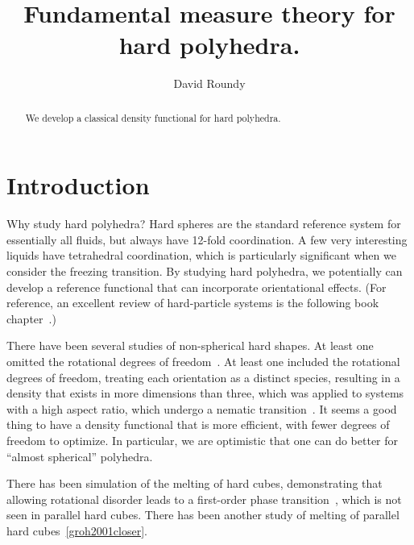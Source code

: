 \documentclass[letterpaper,twocolumn,amsmath,amssymb,pre]{revtex4-1}
\begin{document}
\title{Fundamental measure theory for hard polyhedra.}

\author{David Roundy}
\begin{abstract}
  We develop a classical density functional for hard polyhedra.
\end{abstract}

\maketitle


\section{Introduction}

Why study hard polyhedra? Hard spheres are the standard reference
system for essentially all fluids, but always have 12-fold
coordination.  A few very interesting liquids have tetrahedral
coordination, which is particularly significant when we consider the
freezing transition.  By studying hard polyhedra, we potentially can
develop a reference functional that can incorporate orientational
effects.  (For reference, an excellent review of hard-particle systems
is the following book chapter~\cite{tarazona2008chapter}.)

There have been several studies of non-spherical hard shapes.  At
least one omitted the rotational degrees of
freedom~\cite{cuesta1996cubes, cuesta1997dimensional,
  cuesta1997fundamental, buhot1998numerical, martinez1999fundamental,
  capitan2007hexagons,
  capitan2008phase, martinez2008fundamental}.  At least one included
the rotational degrees of freedom, treating each orientation as a
distinct species, resulting in a density that exists in more
dimensions than three, which was applied to systems with a high aspect
ratio, which undergo a nematic transition~\cite{schmidt2001density,
  esztermann2006density, harnau2008structure, hansen2009fundamental,
  hansen2010tensorial}.  It seems a good thing to have a density
functional that is more efficient, with fewer degrees of freedom to
optimize.  In particular, we are optimistic that one can do better for
``almost spherical'' polyhedra.

There has been simulation of the melting of hard cubes, demonstrating
that allowing rotational disorder leads to a first-order phase
transition~\cite{jagla1998melting}, which is not seen in parallel hard
cubes.  There has been another study of melting of parallel hard
cubes~\ref{groh2001closer}.
\end{document}
